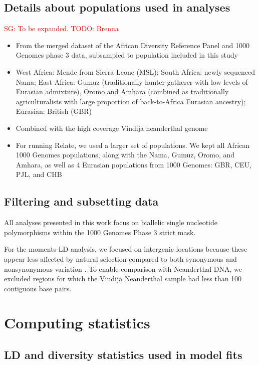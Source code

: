 \documentclass[]{article}
\newcommand{\sgcomment}[1]{{\textcolor{red}{SG: #1}}}
\begin{document}
\subsection{Details about populations used in analyses}

\sgcomment{To be expanded. TODO: Brenna}
\begin{itemize}
    \item From the merged dataset of the African Diversity Reference Panel and
        1000 Genomes phase 3 data, subsampled to population included in this study
    \item West Africa: Mende from Sierra Leone (MSL); South Africa: newly sequenced 
        Nama; East Africa: Gumuz (traditionally hunter-gatherer with low levels of 
        Eurasian admixture), Oromo and Amhara (combined as traditionally 
        agriculturalists with large proportion of back-to-Africa Eurasian ancestry); 
        Eurasian: British (GBR)
    \item Combined with the high coverage Vindija neanderthal genome
    \item For running Relate, we used a larger set of populations. We kept all 
        African 1000 Genomes populations, along with the Nama, Gumuz, Oromo, and
        Amhara, as well as 4 Eurasian populations from 1000 Genomes: GBR, CEU, PJL,
        and CHB
\end{itemize}

\subsection{Filtering and subsetting data}

All analyses presented in this work focus on biallelic single nucleotide
polymorphisms within the 1000 Genomes Phase 3 strict mask.

For the moments-LD analysis, we focused on intergenic locations because these
appear less affected by natural selection compared to both synonymous and
nonsynonymous variation \citep{Ragsdale2018-dd}. To enable comparison with
Neanderthal DNA, we excluded regions for which the Vindija Neanderthal sample
had less than 100 contiguous base pairs. 

\section{Computing statistics}

\subsection{LD and diversity statistics used in model fits}
\end{document}
